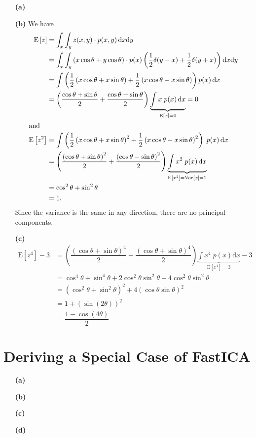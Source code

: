 \documentclass{article}
\newcommand{\prob}[1]{p\!\left(#1\right)}
\newcommand{\expect}[1]{\mathrm{E}\left[#1\right]}
\newcommand{\var}[1]{\mathrm{Var}\left[#1\right]}
\newcommand{\dx}{\mathrm{d}x}
\newcommand{\dy}{\mathrm{d}y}
\begin{document}
\begin{itemize}
\item[\textbf{(a)}]
\item[\textbf{(b)}]
We have
\begin{align*}
\expect{z}
	&= \int_x \int_y z(x,y) \cdot \prob{x,y} \dx\dy \\
	&= \int_x \int_y \left( x \cos\theta + y \cos \theta \right) \cdot \prob{x} \left( \dfrac{1}{2} \delta(y-x) + \dfrac{1}{2} \delta(y+x) \right) \dx \dy \\
	&= \int \left( \dfrac{1}{2} \left( x \cos \theta + x \sin \theta \right) + \dfrac{1}{2} \left( x \cos \theta - x \sin \theta \right) \right) \prob{x} \dx \\
	&= \left( \dfrac{\cos \theta + \sin \theta}{2} + \dfrac{\cos \theta - \sin \theta}{2} \right) \underbrace{\int x \; \prob{x} \dx}_{\expect{x}=0}
	= 0 \\
\intertext{and}
\expect{z^2}
	&= \int \left( \dfrac{1}{2} \left( x \cos \theta + x \sin \theta \right)^2 + \dfrac{1}{2} \left( x \cos \theta - x \sin \theta \right)^2\right) \; \prob{x} \dx \\
	&= \left( \dfrac{\left( \cos \theta + \sin \theta \right)^2}{2} + \dfrac{\left( \cos \theta - \sin \theta \right)^2}{2} \right) \underbrace{\int x^2 \; \prob{x} \dx}_{\expect{x^2} = \var{x} = 1} \\
	&= \cos^2 \theta + \sin^2 \theta \\
	&= 1.
\end{align*}
Since the variance is the same in any direction, there are no principal components.
\item[\textbf{(c)}]
\begin{align*}
\expect{z^4} - 3
	&= \left(  \dfrac{\left( \cos \theta + \sin \theta \right)^4}{2} +  \dfrac{\left( \cos \theta + \sin \theta \right)^4}{2} \right) \underbrace{\int x^4 \; \prob{x} \dx}_{\expect{x^4}=3} - 3 \\
	&= \cos^4 \theta + \sin^4 \theta + 2 \cos^2 \theta \sin^2 \theta + 4 \cos^2 \theta \sin^2 \theta \\
	&= \left( \cos^2 \theta + \sin^2 \theta \right)^2 + 4 \left( \cos \theta \sin \theta \right)^2 \\
	&= 1 + \left( \sin(2 \theta) \right)^2 \\
	&= \dfrac{1 - \cos(4 \theta)}{2}
\end{align*}
\end{itemize}

\section*{Deriving a Special Case of FastICA} 
\begin{itemize}
\item[\textbf{(a)}]
\item[\textbf{(b)}]
\item[\textbf{(c)}]
\item[\textbf{(d)}]
\end{itemize}
\end{document}
